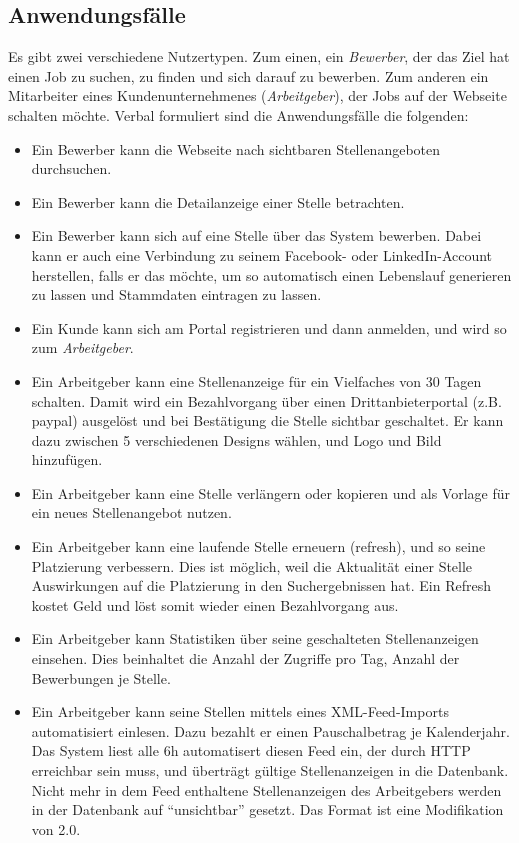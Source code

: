 \subsection{Anwendungsfälle}
Es gibt zwei verschiedene Nutzertypen. Zum einen, ein \textit{Bewerber}, der das Ziel hat einen Job zu suchen, zu finden und sich darauf zu bewerben. Zum anderen ein Mitarbeiter eines Kundenunternehmenes (\textit{Arbeitgeber}), der Jobs auf der Webseite schalten möchte.
Verbal formuliert sind die Anwendungsfälle die folgenden:
\begin{itemize}
 \item Ein Bewerber kann die Webseite nach sichtbaren Stellenangeboten durchsuchen.
 \item Ein Bewerber kann die Detailanzeige einer Stelle betrachten.
 \item Ein Bewerber kann sich auf eine Stelle über das System bewerben. Dabei kann er auch eine Verbindung zu seinem Facebook- oder LinkedIn-Account herstellen, falls er das möchte, um so automatisch einen Lebenslauf generieren zu lassen und Stammdaten eintragen zu lassen.
 \item Ein Kunde kann sich am Portal registrieren und dann anmelden, und wird so zum \textit{Arbeitgeber}.
 \item Ein Arbeitgeber kann eine Stellenanzeige für ein Vielfaches von 30 Tagen schalten. Damit wird ein Bezahlvorgang über einen Drittanbieterportal (z.B. paypal) ausgelöst und bei Bestätigung die Stelle sichtbar geschaltet. Er kann dazu zwischen 5 verschiedenen Designs wählen, und Logo und Bild hinzufügen. 
 \item Ein Arbeitgeber kann eine Stelle verlängern oder kopieren und als Vorlage für ein neues Stellenangebot nutzen.
 \item Ein Arbeitgeber kann eine laufende Stelle erneuern (refresh), und so seine Platzierung verbessern. Dies ist möglich, weil die Aktualität einer Stelle Auswirkungen auf die Platzierung in den Suchergebnissen hat. Ein Refresh kostet Geld und löst somit wieder einen Bezahlvorgang aus.
 \item Ein Arbeitgeber kann Statistiken über seine geschalteten Stellenanzeigen einsehen. Dies beinhaltet die Anzahl der Zugriffe pro Tag, Anzahl der Bewerbungen je Stelle.
 \item Ein Arbeitgeber kann seine Stellen mittels eines XML-Feed-Imports automatisiert einlesen. Dazu bezahlt er einen Pauschalbetrag je Kalenderjahr. Das System liest alle 6h automatisert diesen Feed ein, der durch HTTP erreichbar sein muss, und überträgt gültige Stellenanzeigen in die Datenbank. Nicht mehr in dem Feed enthaltene Stellenanzeigen des Arbeitgebers werden in der Datenbank auf "`unsichtbar"' gesetzt. Das Format ist eine Modifikation von  2.0.
\end{itemize}



